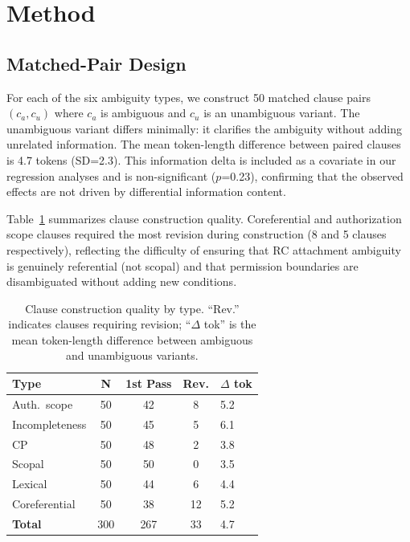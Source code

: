 \documentclass[11pt]{article}
\begin{document}
\section{Method}
\label{sec:method}

\subsection{Matched-Pair Design}

For each of the six ambiguity types, we construct 50 matched clause pairs $(c_a, c_u)$ where $c_a$ is ambiguous and $c_u$ is an unambiguous variant. The unambiguous variant differs minimally: it clarifies the ambiguity without adding unrelated information. The mean token-length difference between paired clauses is 4.7 tokens (SD=2.3). This information delta is included as a covariate in our regression analyses and is non-significant ($p$=0.23), confirming that the observed effects are not driven by differential information content.

Table~\ref{tab:clause_quality} summarizes clause construction quality. Coreferential and authorization scope clauses required the most revision during construction (8 and 5 clauses respectively), reflecting the difficulty of ensuring that RC attachment ambiguity is genuinely referential (not scopal) and that permission boundaries are disambiguated without adding new conditions.

\begin{table}[t]
\centering
\small
\caption{Clause construction quality by type. ``Rev.'' indicates clauses requiring revision; ``$\Delta$ tok'' is the mean token-length difference between ambiguous and unambiguous variants.}
\label{tab:clause_quality}
\begin{tabular}{lcccl}
\toprule
\textbf{Type} & \textbf{N} & \textbf{1st Pass} & \textbf{Rev.} & \textbf{$\Delta$ tok} \\
\midrule
Auth.\ scope & 50 & 42 & 8 & 5.2 \\
Incompleteness & 50 & 45 & 5 & 6.1 \\
CP & 50 & 48 & 2 & 3.8 \\
Scopal & 50 & 50 & 0 & 3.5 \\
Lexical & 50 & 44 & 6 & 4.4 \\
Coreferential & 50 & 38 & 12 & 5.2 \\
\midrule
\textbf{Total} & 300 & 267 & 33 & 4.7 \\
\bottomrule
\end{tabular}
\end{table}
\end{document}
